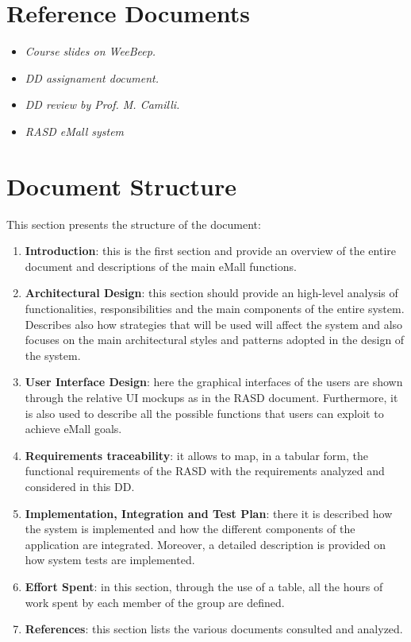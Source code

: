 \section{Reference Documents}
\begin{itemize}
    \item \emph{Course slides on WeeBeep.}
    \item \emph{DD assignament document.}
    \item \emph{DD review by Prof. M. Camilli.}
    \item \emph{RASD eMall system}
\end{itemize}

\section{Document Structure}
This section presents the structure of the document:
\begin{enumerate}
    \item \textbf{Introduction}: this is the first section and provide an overview of the entire document and descriptions of the main eMall functions.
    \item \textbf{Architectural Design}: this section should provide an high-level analysis of functionalities, responsibilities and the main components of the entire system.\\
    Describes also how strategies that will be used will affect the system and also focuses
    on the main architectural styles and patterns adopted in the design of the system.
    \item \textbf{User Interface Design}: here the graphical interfaces of the users are shown through the relative UI mockups as in the RASD document. Furthermore, it is also used to describe all the possible functions that users can exploit to achieve eMall goals.
    \item \textbf{Requirements traceability}: it allows to map, in a tabular form, the functional requirements of the RASD with the requirements analyzed and considered in this DD.
    \item \textbf{Implementation, Integration and Test Plan}: there it is described how the system is implemented and how the different components of the application are integrated. Moreover, a detailed description is provided on how system tests are implemented.
    \item \textbf{Effort Spent}: in this section, through the use of a table, all the hours of work spent by each member of the group are defined.
    \item \textbf{References}: this section lists the various documents consulted and analyzed.
\end{enumerate}